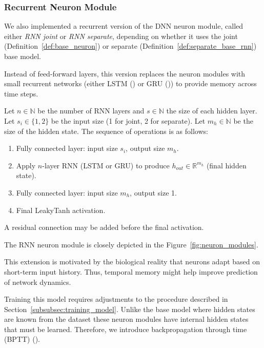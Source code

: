 \subsubsection{Recurrent Neuron Module}
\label{subsubsec:rnn_neuron_module}

We also implemented a recurrent version of the DNN neuron module, called either \emph{RNN joint} or \emph{RNN separate}, depending on whether it uses the joint (Definition~\ref{def:base_neuron}) or separate (Definition~\ref{def:separate_base_rnn}) base model.

Instead of feed-forward layers, this version replaces the neuron modules with small recurrent networks (either LSTM (\citet{hochreiter1997lstm}) or GRU (\citet{cho2014gru})) to provide memory across time steps.

\begin{defn}
    Let $n \in \mathbb{N}$ be the number of RNN layers and $s \in \mathbb{N}$ the size of each hidden layer. Let $s_i \in \{1, 2\}$ be the input size (1 for joint, 2 for separate). Let $m_h \in \mathbb{N}$ be the size of the hidden state. The sequence of operations is as follows:
    
    \begin{enumerate}
        \item Fully connected layer: input size $s_i$, output size $m_h$.
        \item Apply $n$-layer RNN (LSTM or GRU) to produce $h_{out} \in \mathbb{R}^{m_h}$ (final hidden state).
        \item Fully connected layer: input size $m_h$, output size 1.
        \item Final LeakyTanh activation.
    \end{enumerate}
    
    A residual connection may be added before the final activation.
\end{defn}
\label{def:rnn_neuron_module}

The RNN neuron module is closely depicted in the Figure~\ref{fig:neuron_modules}.

This extension is motivated by the biological reality that neurons adapt based on short-term input history. Thus, temporal memory might help improve prediction of network dynamics.

Training this model requires adjustments to the procedure described in Section~\ref{subsubsec:training_model}. Unlike the base model where hidden states are known from the dataset these neuron modules have internal hidden states that must be learned. Therefore, we introduce backpropagation through time (BPTT) (\citet{webos1990btt}).


